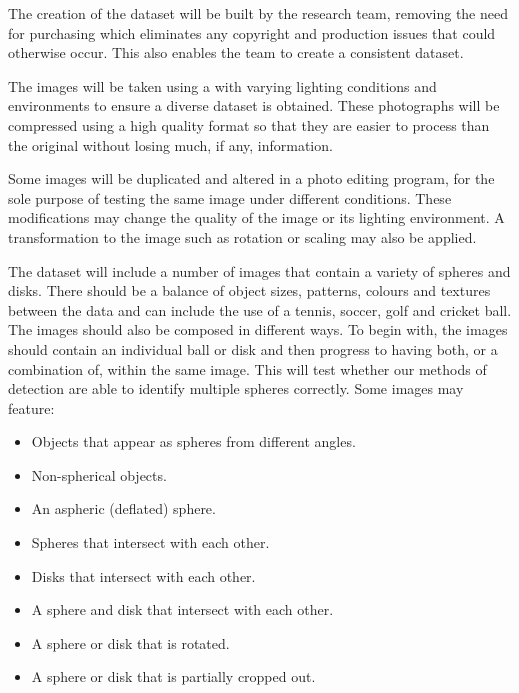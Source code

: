 \documentclass[11pt]{scrartcl}
\begin{document}
{{        	The creation of the dataset will be built by the research team, removing
        	the need for purchasing which eliminates any copyright and production
        	issues that could otherwise occur. This also enables the team to
        	create a consistent dataset.

        	The images will be taken using a  with varying
        	lighting conditions and environments to ensure a diverse dataset is
        	obtained. These photographs will be compressed using a high quality
        	format so that they are easier to process than the original without
        	losing much, if any, information.

        	Some images will be duplicated and altered in a photo editing program,
        	for the sole purpose of testing the same image under different 
        	conditions. These modifications may change the quality of the image or
        	its lighting environment. A transformation to the image such as rotation
        	or scaling may also be applied.

        	The dataset will include a number of images that contain a variety of
        	spheres and disks. There should be a balance of object sizes, patterns,
        	colours and textures between the data and can include the use of a
        	tennis, soccer, golf and cricket ball. The images should also be
        	composed in different ways. To begin with, the images should contain an
        	individual ball or disk and then progress to having both, or a 
        	combination of, within the same image. This will test whether our
        	methods of detection are able to identify multiple spheres correctly.
			Some images may feature:

        	\begin{itemize}
        		\item Objects that appear as spheres from different angles.
        		\item Non-spherical objects.
        		\item An aspheric (deflated) sphere.
        		\item Spheres that intersect with each other.
        		\item Disks that intersect with each other.
        		\item A sphere and disk that intersect with each other.
        		\item A sphere or disk that is rotated.
        		\item A sphere or disk that is partially cropped out.
        	\end{itemize}

}}
\end{document}
